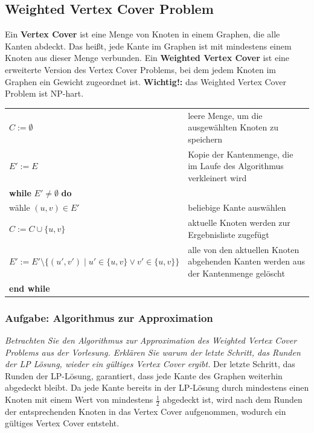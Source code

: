 \documentclass{article}
\begin{document}
\subsection{Weighted Vertex Cover Problem \textcolor{ForestGreen}{\CheckmarkBold}}
 Ein \textbf{Vertex Cover} ist eine Menge von Knoten in einem Graphen, die alle Kanten abdeckt. Das heißt, jede Kante im Graphen ist mit mindestens einem Knoten aus dieser Menge verbunden. \newline 
 Ein \textbf{Weighted Vertex Cover} ist eine erweiterte Version des Vertex Cover Problems, bei dem jedem Knoten im Graphen ein Gewicht zugeordnet ist. \newline
 \textbf{Wichtig!:} das Weighted Vertex Cover Problem ist NP-hart.
\begin{algorithm}[H]
\caption{Approximation des Weighted Vertex Cover Problems}\label{alg:weighted_vertex_cover}
    \centering
    \begin{tabular}{p{6cm} p{11cm}}
        $C := \emptyset$  &  leere Menge, um die ausgewählten Knoten zu speichern \\
        $E' := E$ & Kopie der Kantenmenge, die im Laufe des Algorithmus verkleinert wird \\
        \textbf{while} $E' \neq \emptyset$ \textbf{do} & \\
        \setlength\parindent{12pt} wähle $(u, v) \in E'$ & beliebige Kante auswählen  \\
        \setlength\parindent{12pt}$C := C \cup \{u, v\}$  & aktuelle Knoten werden zur Ergebnisliste zugefügt\\
        \setlength\parindent{12pt}   $E' := E' \setminus \{(u', v') \mid u' \in \{u, v\} \lor v' \in \{u, v\}\}$ &  alle von den aktuellen Knoten abgehenden Kanten werden aus der Kantenmenge gelöscht \\
        \textbf{end while} & \\
    \end{tabular}
    \caption{Weighted Vertex Cover}
    \label{tab:my_label}
\end{algorithm}

\newpage
\subsubsection{Aufgabe: Algorithmus zur Approximation \textcolor{ForestGreen}{\CheckmarkBold}}
\textit{Betrachten Sie den Algorithmus zur Approximation des Weighted Vertex Cover Problems aus der Vorlesung. Erklären Sie warum der letzte Schritt, das Runden der LP Lösung, wieder ein gültiges Vertex Cover ergibt. } \cite{hauptklausur21}  \newline  \newline 
Der letzte Schritt, das Runden der LP-Lösung, garantiert, dass jede Kante des Graphen weiterhin abgedeckt bleibt. Da jede Kante bereits in der LP-Lösung durch mindestens einen Knoten mit einem Wert von mindestens $\frac{1}{2}$ abgedeckt ist, wird nach dem Runden der entsprechenden Knoten in das Vertex Cover aufgenommen, wodurch ein gültiges Vertex Cover entsteht.\newline
\end{document}
